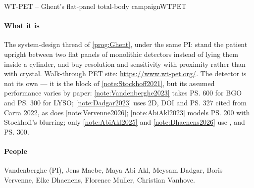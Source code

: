 \begin{programnote}{WT-PET -- Ghent's flat-panel total-body campaign}{WTPET}

\paragraph{What it is}
The system-design thread of \ref{prog:Ghent}, under the same PI: stand the
patient upright between two flat panels of monolithic detectors instead of
lying them inside a cylinder, and buy resolution and sensitivity with
proximity rather than with crystal. Walk-through PET site:
\url{https://www.wt-pet.org/}. The detector is not its own --- it is the
 block of \ref{note:Stockhoff2021}, but its
assumed performance varies by paper: \ref{note:Vandenberghe2023} takes \ps{600}
for BGO and \ps{300} for LYSO; \ref{note:Dadgar2023} uses  2D, 
DOI and \ps{327} cited from Carra 2022, as does \ref{note:Vervenne2026};
\ref{note:AbiAkl2023} models \ps{200}
with Stockhoff's blurring; only \ref{note:AbiAkl2025} and
\ref{note:Dhaenens2026} use ,  and \ps{300}.

\paragraph{People}
Vandenberghe (PI), Jens Maebe, Maya Abi Akl, Meysam Dadgar, Boris Vervenne,
Elke Dhaenens, Florence Muller, Christian Vanhove.


\end{programnote}
